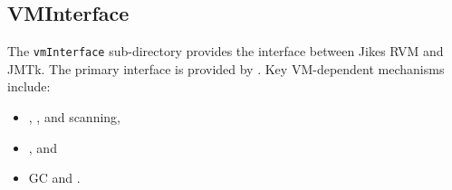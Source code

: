 \subsection{VMInterface} \label{sssec:vminterface}

The \texttt{vmInterface} sub-directory provides the interface between
Jikes RVM and JMTk.  The primary interface is provided by
.  Key
VM-dependent mechanisms include:

\begin{itemize}
\item {},
  , and
   scanning,
\item {}, and
\item GC  and .
\end{itemize}

